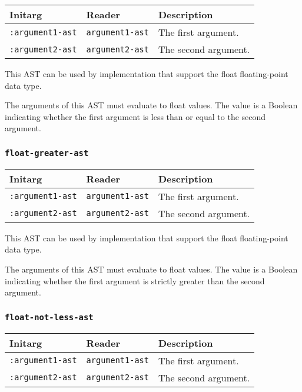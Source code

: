 \begin{tabular}{|l|l|l|}
\hline
Initarg & Reader & Description\\
\hline\hline
\texttt{:argument1-ast} & \texttt{argument1-ast} & The first argument.\\
\hline
\texttt{:argument2-ast} & \texttt{argument2-ast} & The second argument.\\
\hline
\end{tabular}

This AST can be used by implementation that support the float
floating-point data type.  

The arguments of this AST must evaluate to float
values.  The value is a Boolean indicating whether the first argument
is less than or equal to the second argument.

\subsubsection{\texttt{float-greater-ast}}
\label{sec-ast-float-greater}

\begin{tabular}{|l|l|l|}
\hline
Initarg & Reader & Description\\
\hline\hline
\texttt{:argument1-ast} & \texttt{argument1-ast} & The first argument.\\
\hline
\texttt{:argument2-ast} & \texttt{argument2-ast} & The second argument.\\
\hline
\end{tabular}

This AST can be used by implementation that support the float
floating-point data type.  

The arguments of this AST must evaluate to float
values.  The value is a Boolean indicating whether the first argument
is strictly greater than the second argument.

\subsubsection{\texttt{float-not-less-ast}}
\label{sec-ast-float-not-less}

\begin{tabular}{|l|l|l|}
\hline
Initarg & Reader & Description\\
\hline\hline
\texttt{:argument1-ast} & \texttt{argument1-ast} & The first argument.\\
\hline
\texttt{:argument2-ast} & \texttt{argument2-ast} & The second argument.\\
\hline
\end{tabular}


